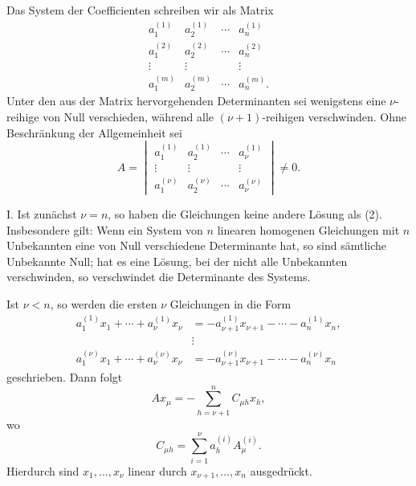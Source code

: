 \documentclass[11pt]{article}
\begin{document}
Das System der Coefficienten schreiben wir als Matrix
\begin{equation}
\begin{array}{cccc}
 a_1^{(1)}&a_2^{(1)}&\cdots&a_n^{(1)}\\
 a_1^{(2)}&a_2^{(2)}&\cdots&a_n^{(2)}\\
 \vdots&\vdots&&\vdots\\
 a_1^{(m)}&a_2^{(m)}&\cdots&a_n^{(m)}.
\end{array}
\tag{3}
\end{equation}
Unter den aus der Matrix hervorgehenden Determinanten sei wenigstens eine \(\nu\)-reihige von Null verschieden, während alle \((\nu+1)\)-reihigen verschwinden.  Ohne Beschränkung der Allgemeinheit sei
\begin{equation}
        A=\begin{vmatrix}
        a_1^{(1)}&a_2^{(1)}&\cdots&a_\nu^{(1)}\\
        \vdots&\vdots&&\vdots\\
        a_1^{(\nu)}&a_2^{(\nu)}&\cdots&a_\nu^{(\nu)}
        \end{vmatrix}\ne0.
\tag{4}
\end{equation}

I. Ist zunächst \(\nu=n\), so haben die Gleichungen keine andere Lösung als (2).  Insbesondere gilt: Wenn ein System von \(n\) linearen homogenen Gleichungen mit \(n\) Unbekannten eine von Null verschiedene Determinante hat, so sind sämtliche Unbekannte Null; hat es eine Lösung, bei der nicht alle Unbekannten verschwinden, so verschwindet die Determinante des Systems.

Ist \(\nu<n\), so werden die ersten \(\nu\) Gleichungen in die Form
\begin{equation}
\begin{aligned}
 a_1^{(1)}x_1+\cdots+a_\nu^{(1)}x_\nu&=-a_{\nu+1}^{(1)}x_{\nu+1}-\cdots-a_n^{(1)}x_n,\\
 &\vdots\\
 a_1^{(\nu)}x_1+\cdots+a_\nu^{(\nu)}x_\nu&=-a_{\nu+1}^{(\nu)}x_{\nu+1}-\cdots-a_n^{(\nu)}x_n
\end{aligned}
\tag{6}
\end{equation}
geschrieben.  Dann folgt
\begin{equation}
        A x_\mu=-\sum_{h=\nu+1}^{n} C_{\mu h}x_h,
\tag{7}
\end{equation}
wo
\begin{equation}
        C_{\mu h}=\sum_{i=1}^{\nu}a_h^{(i)}A_\mu^{(i)}.
\tag{8}
\end{equation}
Hierdurch sind \(x_1,\ldots,x_\nu\) linear durch \(x_{\nu+1},\ldots,x_n\) ausgedrückt.
\end{document}
